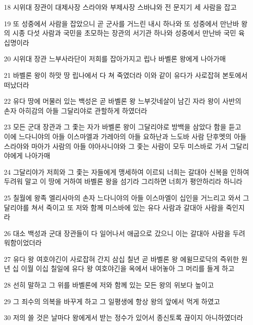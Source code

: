 \par 18 시위대 장관이 대제사장 스라야와 부제사장 스바냐와 전 문지기 세 사람을 잡고
\par 19 또 성중에서 사람을 잡았으니 곧 군사를 거느린 내시 하나와 또 성중에서 만난바 왕의 시종 다섯 사람과 국민을 초모하는 장관의 서기관 하나와 성중에서 만난바 국민 육십명이라
\par 20 시위대 장관 느부사라단이 저희를 잡아가지고 립나 바벨론 왕에게 나아가매
\par 21 바벨론 왕이 하맛 땅 립나에서 다 쳐 죽였더라 이와 같이 유다가 사로잡혀 본토에서 떠났더라
\par 22 유다 땅에 머물러 있는 백성은 곧 바벨론 왕 느부갓네살이 남긴 자라 왕이 사반의 손자 아히감의 아들 그달리야로 관할하게 하였더라
\par 23 모든 군대 장관과 그 좇는 자가 바벨론 왕이 그달리야로 방백을 삼았다 함을 듣고 이에 느다니야의 아들 이스마엘과 가레아의 아들 요하난과 느도바 사람 단후멧의 아들 스라야와 마아가 사람의 아들 야아사니야와 그 좇는 사람이 모두 미스바로 가서 그달리야에게 나아가매
\par 24 그달리야가 저희와 그 좇는 자들에게 맹세하여 이르되 너희는 갈대아 신복을 인하여 두려워 말고 이 땅에 거하여 바벨론 왕을 섬기라 그리하면 너희가 평안하리라 하니라
\par 25 칠월에 왕족 엘리사마의 손자 느다니야의 아들 이스마엘이 십인을 거느리고 와서 그달리야를 쳐서 죽이고 또 저와 함께 미스바에 있는 유다 사람과 갈대아 사람을 죽인지라
\par 26 대소 백성과 군대 장관들이 다 일어나서 애굽으로 갔으니 이는 갈대아 사람을 두려워함이었더라
\par 27 유다 왕 여호야긴이 사로잡혀 간지 삼십 칠년 곧 바벨론 왕 에윌므로닥의 즉위한 원년 십 이월 이십 칠일에 유다 왕 여호야긴을 옥에서 내어놓아 그 머리를 들게 하고
\par 28 선히 말하고 그 위를 바벨론에 저와 함께 있는 모든 왕의 위보다 높이고
\par 29 그 죄수의 의복을 바꾸게 하고 그 일평생에 항상 왕의 앞에서 먹게 하였고
\par 30 저의 쓸 것은 날마다 왕에게서 받는 정수가 있어서 종신토록 끊이지 아니하였더라


